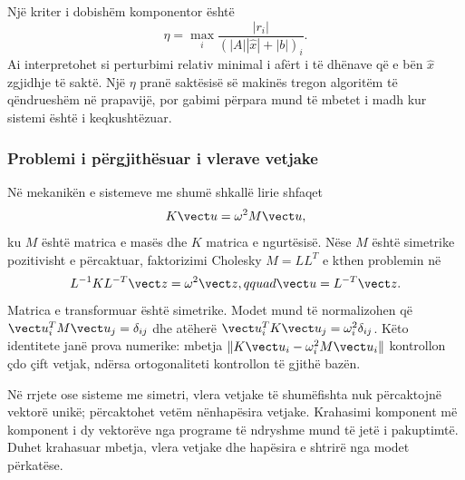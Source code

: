 Një kriter i dobishëm komponentor është
\begin{equation}
 \eta=\max_i\frac{|r_i|}{(|A||\widehat x|+|b|)_i}.
\end{equation}
Ai interpretohet si perturbimi relativ minimal i afërt i të dhënave që e bën $\widehat x$ zgjidhje të saktë. Një $\eta$ pranë saktësisë së makinës tregon algoritëm të qëndrueshëm në prapavijë, por gabimi përpara mund të mbetet i madh kur sistemi është i keqkushtëzuar.

\subsubsection{Problemi i përgjithësuar i vlerave vetjake}
Në mekanikën e sistemeve me shumë shkallë lirie shfaqet
\begin{equation}
 K\vect u=\omega^2M\vect u,
\end{equation}
ku $M$ është matrica e masës dhe $K$ matrica e ngurtësisë. Nëse $M$ është simetrike pozitivisht e përcaktuar, faktorizimi Cholesky $M=LL^T$ e kthen problemin në
\begin{equation}
 L^{-1}KL^{-T}\vect z=\omega^2\vect z,qquad \vect u=L^{-T}\vect z.
\end{equation}
Matrica e transformuar është simetrike. Modet mund të normalizohen që $\vect u_i^TM\vect u_j=\delta_{ij}$ dhe atëherë $\vect u_i^TK\vect u_j=\omega_i^2\delta_{ij}$. Këto identitete janë prova numerike: mbetja $\|K\vect u_i-\omega_i^2M\vect u_i\|$ kontrollon çdo çift vetjak, ndërsa ortogonaliteti kontrollon të gjithë bazën.

Në rrjete ose sisteme me simetri, vlera vetjake të shumëfishta nuk përcaktojnë vektorë unikë; përcaktohet vetëm nënhapësira vetjake. Krahasimi komponent më komponent i dy vektorëve nga programe të ndryshme mund të jetë i pakuptimtë. Duhet krahasuar mbetja, vlera vetjake dhe hapësira e shtrirë nga modet përkatëse.
